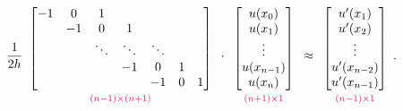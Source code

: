 \begin{align}
\frac{1}{2h}
\begin{array}{c}
\begin{bmatrix}
-1 &0 & 1 & \\
& -1 & 0 & 1  \\
& & \ddots & \ddots & \ddots & \\
& & & -1 & 0 & 1 \\
& & & & -1 & 0 & 1
\end{bmatrix}\\
{\scriptstyle\textcolor{red}{(n-1)\times(n+1)}}
\end{array}\cdot
\begin{array}{c}
\begin{bmatrix}
u(x_0) \\ u(x_1)\\ \vdots  \\ u(x_{n-1}) \\ u(x_n)
\end{bmatrix}\\
{\scriptstyle\textcolor{red}{(n+1)\times1}}
\end{array} \approx
\begin{array}{c}
\begin{bmatrix}
u'(x_1) \\ u'(x_2)\\ \vdots  \\ u'(x_{n-2}) \\ u'(x_{n-1})
\end{bmatrix}\\
{\scriptstyle\textcolor{red}{(n-1)\times1}}
\end{array}.
\label{finitedifference2:up}
\end{align}

